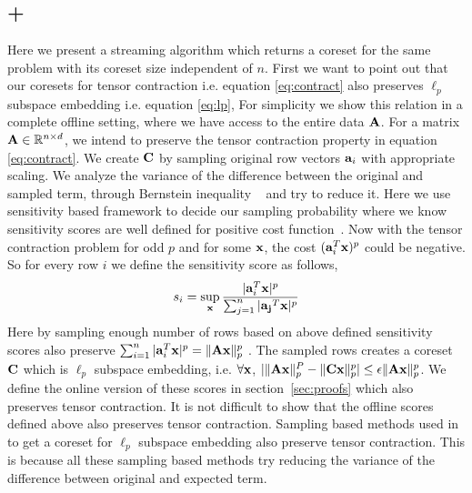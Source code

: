 \subsection{\online+\mrlw}
Here we present a streaming algorithm which returns a coreset for the same problem with its coreset size independent of $n$. First we want to point out that our coresets for tensor contraction i.e. equation \eqref{eq:contract} also preserves $\ell_p$ subspace embedding i.e. equation \eqref{eq:lp},
For simplicity we show this relation in a complete offline setting, where we have access to the entire data $\mathbf{A}$.
For a matrix $\mathbf{A} \in \mathbb{R}^{n \times d}$, we intend to preserve the tensor contraction property in equation \eqref{eq:contract}. We create $\mathbf{C}$ by sampling original row vectors $\mathbf{a}_{i}$ with appropriate scaling. 
We analyze the variance of the difference between the original and sampled term, through Bernstein inequality ~\cite{dubhashi2009concentration} and try to reduce it. 
Here we use sensitivity based framework to decide our sampling probability where we know sensitivity scores are well defined for positive cost function~\cite{langberg2010universal}. Now with the tensor contraction problem for odd $p$ and for some $\mathbf{x}$, the cost $(\mathbf{a}_{i}^{T}\mathbf{x})^{p}$ could be negative. So for every row $i$ we define the sensitivity score as follows,
\begin{equation}{\label{eqn:sensitivity}}
 s_{i} = \sup_{\mathbf{x}}\frac{|\mathbf{a}_{i}^{T}\mathbf{x}|^{p}}{\sum_{j=1}^{n}|\mathbf{a_{j}}^{T}\mathbf{x}|^{p}}
\end{equation}
Here by sampling enough number of rows based on above defined sensitivity scores also preserve $\sum_{i=1}^{n}|\mathbf{a}_{i}^{T}\mathbf{x}|^{p} = \|\mathbf{A}\mathbf{x}\|_{p}^{p}$ \cite{langberg2010universal}. The sampled rows creates a coreset $\mathbf{C}$ which is $\ell_{p}$ subspace embedding, i.e. $\forall \mathbf{x}$, $|\|\mathbf{A}\mathbf{x}\|_{p}^{P} - \|\mathbf{C}\mathbf{x}\|_{p}^{p}| \leq \epsilon \|\mathbf{A}\mathbf{x}\|_{p}^{p}$. We define the online version of these scores in section~\ref{sec:proofs} which also preserves tensor contraction. It is not difficult to show that the offline scores defined above also preserves tensor contraction.
Sampling based methods used in~\cite{dasgupta2009sampling, cohen2015p, clarkson2016fast} to get a coreset for $\ell_{p}$ subspace embedding also preserve tensor contraction. This is because all these sampling based methods try reducing the variance of the difference between original and expected term.

